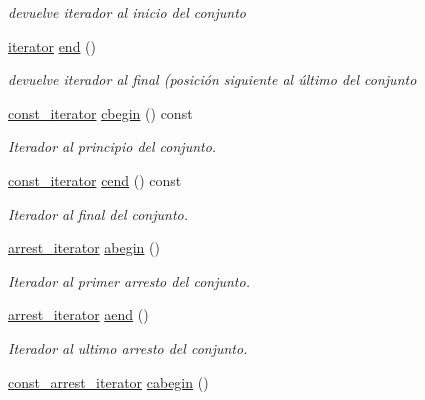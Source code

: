 \begin{DoxyCompactItemize}
\begin{DoxyCompactList}\small\item\em devuelve iterador al inicio del conjunto \end{DoxyCompactList}\item 
\hypertarget{classconjunto_ab9be89e672032da4f0945663c76e9f1b}{}\hyperlink{classconjunto_1_1iterator}{iterator} \hyperlink{classconjunto_ab9be89e672032da4f0945663c76e9f1b}{end} ()\label{classconjunto_ab9be89e672032da4f0945663c76e9f1b}

\begin{DoxyCompactList}\small\item\em devuelve iterador al final (posición siguiente al último del conjunto \end{DoxyCompactList}\item 
\hyperlink{classconjunto_1_1const__iterator}{const\+\_\+iterator} \hyperlink{classconjunto_a78ee14dbb357a4383f021d9b29a250ed}{cbegin} () const 
\begin{DoxyCompactList}\small\item\em Iterador al principio del conjunto. \end{DoxyCompactList}\item 
\hyperlink{classconjunto_1_1const__iterator}{const\+\_\+iterator} \hyperlink{classconjunto_a7e07e4ac274c404bdaeb6159cb480d6a}{cend} () const 
\begin{DoxyCompactList}\small\item\em Iterador al final del conjunto. \end{DoxyCompactList}\item 
\hyperlink{classconjunto_1_1arrest__iterator}{arrest\+\_\+iterator} \hyperlink{classconjunto_ae363e994be38a35b0e0fb9529eb187db}{abegin} ()
\begin{DoxyCompactList}\small\item\em Iterador al primer arresto del conjunto. \end{DoxyCompactList}\item 
\hyperlink{classconjunto_1_1arrest__iterator}{arrest\+\_\+iterator} \hyperlink{classconjunto_a0f7f127bf578c8b5d2803703d6beb6bb}{aend} ()
\begin{DoxyCompactList}\small\item\em Iterador al ultimo arresto del conjunto. \end{DoxyCompactList}\item 
\hyperlink{classconjunto_1_1const__arrest__iterator}{const\+\_\+arrest\+\_\+iterator} \hyperlink{classconjunto_a60e35f87499995d5d80d91b80ec4e3f3}{cabegin} ()

\end{DoxyCompactItemize}
